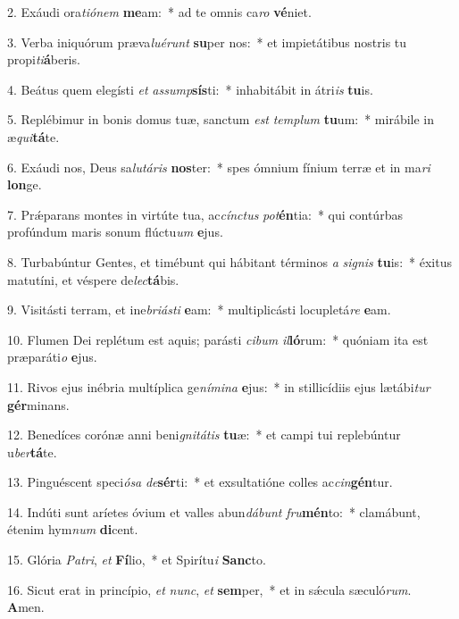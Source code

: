 2. Exáudi ora\textit{ti}\textit{ó}\textit{nem} \textbf{me}am:~*  ad te omnis ca\textit{ro} \textbf{vé}niet.\

3. Verba iniquórum præva\textit{lu}\textit{é}\textit{runt} \textbf{su}per nos:~*  et impietátibus nostris tu propi\textit{ti}\textbf{á}beris.\

4. Beátus quem elegísti \textit{et} \textit{as}\textit{sump}\textbf{sís}ti:~*  inhabitábit in átri\textit{is} \textbf{tu}is.\

5. Replébimur in bonis domus tuæ, sanctum \textit{est} \textit{tem}\textit{plum} \textbf{tu}um:~*  mirábile in æ\textit{qui}\textbf{tá}te.\

6. Exáudi nos, Deus sa\textit{lu}\textit{tá}\textit{ris} \textbf{nos}ter:~*  spes ómnium fínium terræ et in ma\textit{ri} \textbf{lon}ge.\

7. Prǽparans montes in virtúte tua, ac\textit{cínc}\textit{tus} \textit{pot}\textbf{én}tia:~*  qui contúrbas profúndum maris sonum flúctu\textit{um} \textbf{e}jus.\

8. Turbabúntur Gentes, et timébunt qui hábitant términos \textit{a} \textit{si}\textit{gnis} \textbf{tu}is:~*  éxitus matutíni, et véspere de\textit{lec}\textbf{tá}bis.\

9. Visitásti terram, et ine\textit{bri}\textit{ás}\textit{ti} \textbf{e}am:~*  multiplicásti locupletá\textit{re} \textbf{e}am.\

10. Flumen Dei replétum est aquis; parásti \textit{ci}\textit{bum} \textit{il}\textbf{ló}rum:~*  quóniam ita est præparáti\textit{o} \textbf{e}jus.\

11. Rivos ejus inébria multíplica ge\textit{ní}\textit{mi}\textit{na} \textbf{e}jus:~*  in stillicídiis ejus lætábi\textit{tur} \textbf{gér}minans.\

12. Benedíces corónæ anni beni\textit{gni}\textit{tá}\textit{tis} \textbf{tu}æ:~*  et campi tui replebúntur u\textit{ber}\textbf{tá}te.\

13. Pinguéscent speci\textit{ó}\textit{sa} \textit{de}\textbf{sér}ti:~*  et exsultatióne colles ac\textit{cin}\textbf{gén}tur.\

14. Indúti sunt aríetes óvium et valles abun\textit{dá}\textit{bunt} \textit{fru}\textbf{mén}to:~*  clamábunt, étenim hym\textit{num} \textbf{di}cent.\

15. Glória \textit{Pa}\textit{tri}, \textit{et} \textbf{Fí}lio,~*  et Spirítu\textit{i} \textbf{Sanc}to.\

16. Sicut erat in princípio, \textit{et} \textit{nunc}, \textit{et} \textbf{sem}per,~*  et in sǽcula sæculó\textit{rum}. \textbf{A}men.\


